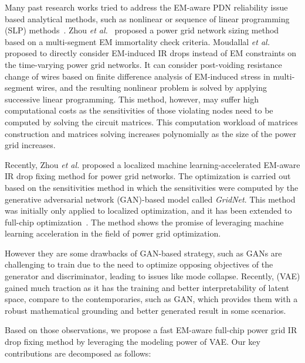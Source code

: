 Many past research works tried to address the EM-aware PDN reliability issue based analytical methods, such as nonlinear or sequence of linear programming (SLP) methods~\cite{ChBr:TCAD'88,DuMa:DAC'89,Tan:DAC'99,Wang:TCAD'05,ZhouSun:TVLSI'19, Sukharev:2019pg, ZhouYu:ASPDAC'20,ZhouJin:ICCAD'20}. Zhou {\it et al.}~\cite{ZhouSun:TVLSI'19,ZhouChen:Integration'21} proposed a power grid network sizing method based on a multi-segment EM immortality check criteria. Moudallal {\it et al.}~\cite{Sukharev:2019pg} proposed to directly consider EM-induced IR drops instead of EM constraints on the time-varying power grid networks. It can consider post-voiding resistance change of wires based on finite difference analysis of EM-induced stress in multi-segment wires, and the resulting nonlinear problem is solved by applying successive linear programming. This method, however, may suffer high computational costs as the sensitivities of those violating nodes need to be computed by solving the circuit matrices. This computation workload of matrices construction and matrices solving increases polynomially as the size of the power grid increases. 
   
Recently, Zhou {\it et al.} proposed a localized machine learning-accelerated EM-aware IR drop fixing method for power grid networks. The optimization is carried out based on the sensitivities method in which the sensitivities were computed by the generative adversarial network (GAN)-based model called {\it GridNet}. This method was initially only applied to localized optimization, and it has been extended to full-chip optimization~\cite{HanLiu:TCAD'22-23}.  The method shows the promise of leveraging machine learning acceleration in the field of power grid optimization.

However they are some drawbacks of GAN-based strategy, such as GANs are challenging to train due to the need to optimize opposing objectives of the generator and discriminator, leading to issues like mode collapse. Recently,  (VAE) gained much traction as it has the training and better interpretability of latent space, compare to the contemporaries, such as GAN, which provides them with a robust mathematical grounding and better generated result in some scenarios. 

Based on those observations, we propose a fast EM-aware full-chip power grid IR drop fixing method by leveraging the modeling power of VAE. Our key contributions are decomposed as follows:

